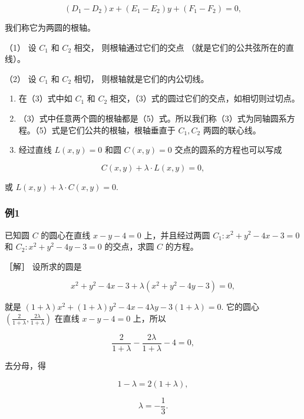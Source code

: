 \[
(D_{1} - D_{2}) x + (E_{1} - E_{2}) y + (F_{1} - F_{2}) = 0, \tag {5}
\]

我们称它为两圆的根轴。

（1） 设 \(C_1\) 和 \(C_2\) 相交， 则根轴通过它们的交点
（就是它们的公共弦所在的直线）。

（2） 设 \(C_{1}\) 和 \(C_{2}\) 相切， 则根轴就是它们的内公切线。

\begin{enumerate}
\def\labelenumi{\arabic{enumi}.}
\setcounter{enumi}{2}
\item
  在（3）式中如 \(C_1\) 和 \(C_2\)
  相交，（3）式的圆过它们的交点，如相切则过切点。
\item
  （3）式中任意两个圆的根轴都是（5）式。所以我们称（3）式为同轴圆系方程。（5）式是它们公共的根轴，根轴垂直于
  \(C_1, C_2\) 两圆的联心线。
\item
  经过直线 \(L(x, y) = 0\) 和圆 \(C(x, y) = 0\)
  交点的圆系的方程也可以写成
\end{enumerate}

\[
C (x, y) + \lambda \cdot L (x, y) = 0,
\]

或 \(L(x, y) + \lambda \cdot C(x, y) = 0.\)

\subsubsection{例1}\label{ux4f8b1-24}

已知圆 \(C\) 的圆心在直线 \(x - y - 4 = 0\) 上，并且经过两圆
\(C_{1}: x^{2} + y^{2} - 4x - 3 = 0\) 和
\(C_{2}: x^{2} + y^{2} - 4y - 3 = 0\) 的交点，求圆 \(C\) 的方程。

［解］ 设所求的圆是

\[
x^{2} + y^{2} - 4 x - 3 + \lambda (x^{2} + y^{2} - 4 y - 3) = 0, \tag {1}
\]

就是
\((1 + \lambda)x^{2} + (1 + \lambda)y^{2} - 4x - 4\lambda y - 3(1 + \lambda) = 0.\)
它的圆心
\(\left(\frac{2}{1 + \lambda}, \frac{2\lambda}{1 + \lambda}\right)\)
在直线 \(x - y - 4 = 0\) 上，所以

\[
\frac {2}{1 + \lambda} - \frac {2 \lambda}{1 + \lambda} - 4 = 0,
\]

去分母，得

\[
1 - \lambda = 2 (1 + \lambda),
\]

\[
\lambda = - \frac {1}{3}.
\]

